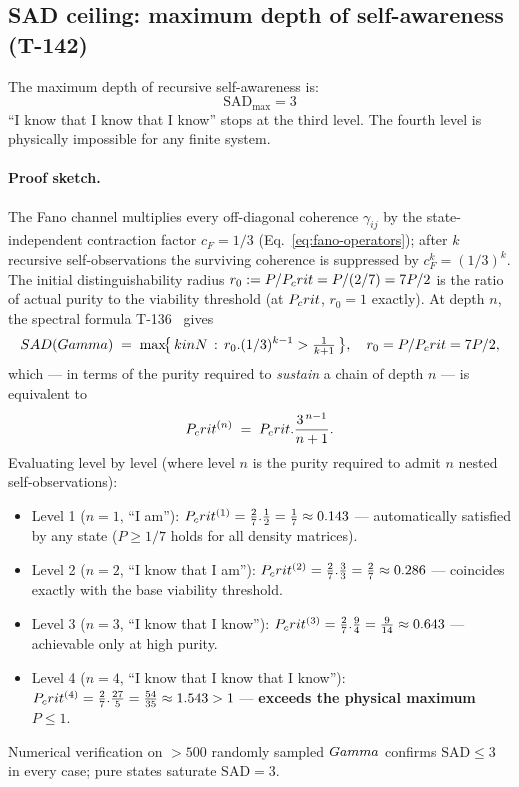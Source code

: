 \subsection{SAD ceiling: maximum depth of self-awareness (T-142)}
\label{subsec:sad-ceiling}

\begin{theorembox}
The maximum depth of recursive self-awareness is:
\begin{equation}
  \mathrm{SAD}_{\max} = 3
  \label{eq:sad-max}
\end{equation}
``I know that I know that I know'' stops at the third level. The fourth level is
physically impossible for any finite system.
\end{theorembox}

\paragraph{Proof sketch.}
The Fano channel multiplies every off-diagonal coherence $\gamma_{ij}$ by the
state-independent contraction factor $c_F = 1/3$
(Eq.~\ref{eq:fano-operators}); after $k$ recursive self-observations the
surviving coherence is suppressed by $c_F^k = (1/3)^k$. The initial
distinguishability radius $r_0 := P/P_crit = P/(2/7) = 7P/2$ is the
ratio of actual purity to the viability threshold (at $P_crit$,
$r_0 = 1$ exactly). At depth $n$, the spectral formula
T-136~ gives
\begin{equation}
  SAD(Gamma) \;=\; \max\!\bigl\{\,k in N\,:\,
    r_0 . (1/3)^{k-1} > \tfrac{1}{k+1} \,\bigr\},
  \quad r_0 = P/P_crit = 7P/2,
\end{equation}
which --- in terms of the purity required to \emph{sustain} a chain of depth $n$ --- is
equivalent to
\begin{equation}
  P_crit^{(n)} \;=\; P_crit . \frac{3^{\,n-1}}{n+1}.
\end{equation}
Evaluating level by level (where level $n$ is the purity required to admit $n$ nested
self-observations):
\begin{itemize}[leftmargin=2em]
  \item Level 1 ($n=1$, ``I am''): $P_crit^{(1)} = \frac{2}{7} . \frac{1}{2}
        = \frac{1}{7} \approx 0.143$ --- automatically satisfied by any state
        ($P \geq 1/7$ holds for all density matrices).
  \item Level 2 ($n=2$, ``I know that I am''): $P_crit^{(2)} = \frac{2}{7} .
        \frac{3}{3} = \frac{2}{7} \approx 0.286$ --- coincides exactly with the
        base viability threshold.
  \item Level 3 ($n=3$, ``I know that I know''): $P_crit^{(3)} = \frac{2}{7} .
        \frac{9}{4} = \frac{9}{14} \approx 0.643$ --- achievable only at high purity.
  \item Level 4 ($n=4$, ``I know that I know that I know''): $P_crit^{(4)} =
        \frac{2}{7} . \frac{27}{5} = \frac{54}{35} \approx 1.543 > 1$ ---
        \textbf{exceeds the physical maximum $P \leq 1$}.
\end{itemize}
Numerical verification on $> 500$ randomly sampled $Gamma$ confirms $\mathrm{SAD} \leq 3$
in every case; pure states saturate $\mathrm{SAD} = 3$.

